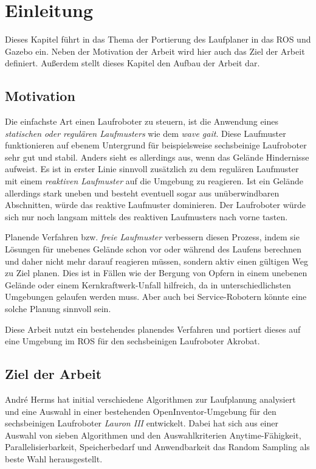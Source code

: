 \chapter{Einleitung}
\label{kap1}

Dieses Kapitel führt in das Thema der Portierung des Laufplaner in das \ac{ROS} und Gazebo ein. Neben der Motivation der Arbeit wird hier auch das Ziel der Arbeit definiert. Außerdem stellt dieses Kapitel den Aufbau der Arbeit dar. 

\section{Motivation}

Die einfachste Art einen Laufroboter zu steuern, ist die Anwendung eines \emph{statischen oder regulären Laufmusters} wie dem \emph{wave gait}. Diese Laufmuster funktionieren auf ebenem Untergrund für beispielsweise sechsbeinige Laufroboter sehr gut und stabil. Anders sieht es allerdings aus, wenn das Gelände Hindernisse aufweist. Es ist in erster Linie sinnvoll zusätzlich zu dem regulären Laufmuster mit einem \emph{reaktiven Laufmuster} auf die Umgebung zu reagieren. Ist ein Gelände allerdings stark uneben und besteht eventuell sogar aus unüberwindbaren Abschnitten, würde das reaktive Laufmuster dominieren. Der Laufroboter würde sich nur noch langsam mittels des reaktiven Laufmusters nach vorne tasten.

Planende Verfahren bzw. \emph{freie Laufmuster} verbessern diesen Prozess, indem sie Lösungen für unebenes Gelände schon vor oder während des Laufens berechnen und daher nicht mehr darauf reagieren müssen, sondern aktiv einen gültigen Weg zu Ziel planen. Dies ist in Fällen wie der Bergung von Opfern in einem unebenen Gelände oder einem Kernkraftwerk-Unfall hilfreich, da in unterschiedlichsten Umgebungen gelaufen werden muss. Aber auch bei Service-Robotern könnte eine solche Planung sinnvoll sein.

Diese Arbeit nutzt ein bestehendes planendes Verfahren und portiert dieses auf eine Umgebung im \ac{ROS} für den sechsbeinigen Laufroboter Akrobat.

\section{Ziel der Arbeit}

André Herms \autocite{herms2004} hat initial verschiedene Algorithmen zur Laufplanung analysiert und eine Auswahl in einer bestehenden OpenInventor-Umgebung \autocite{inventor} für den sechsbeinigen Laufroboter \emph{Lauron III} entwickelt. Dabei hat sich aus einer Auswahl von sieben Algorithmen und den Auswahlkriterien Anytime-Fähigkeit, Parallelisierbarkeit, Speicherbedarf und Anwendbarkeit das Random Sampling als beste Wahl herausgestellt.

